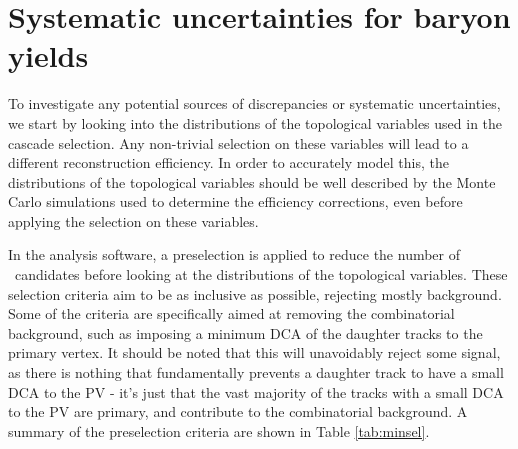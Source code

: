 \section{Systematic uncertainties for \texorpdfstring{\Xi}{Xi} baryon yields}
    To investigate any potential sources of discrepancies or systematic uncertainties, we start by looking into the distributions of the topological variables used in the cascade selection. Any non-trivial selection on these variables will lead to a different reconstruction efficiency. In order to accurately model this, the distributions of the topological variables should be well described by the Monte Carlo simulations used to determine the efficiency corrections, even before applying the selection on these variables. 

  In the analysis software, a preselection is applied to reduce the number of \Xi\ candidates before looking at the distributions of the topological variables. These selection criteria aim to be as inclusive as possible, rejecting mostly background. Some of the criteria are specifically aimed at removing the combinatorial background, such as imposing a minimum DCA of the daughter tracks to the primary vertex. It should be noted that this will unavoidably reject some signal, as there is nothing that fundamentally prevents a daughter track to have a small DCA to the PV - it's just that the vast majority of the tracks with a small DCA to the PV are primary, and contribute to the combinatorial background. A summary of the preselection criteria are shown in Table \ref{tab:minsel}.

